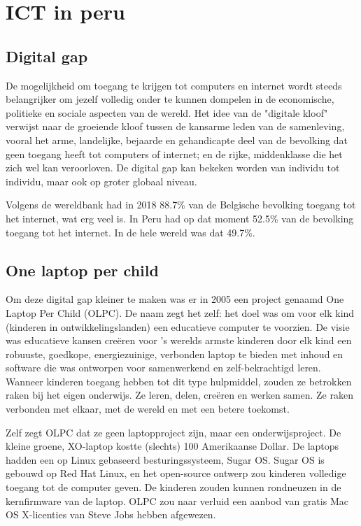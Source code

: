 \section{ICT in peru}
\subsection{Digital gap}
De mogelijkheid om toegang te krijgen tot computers en internet wordt steeds belangrijker om jezelf volledig onder te kunnen dompelen in de economische, politieke en sociale aspecten van de wereld. Het idee van de "digitale kloof" verwijst naar de groeiende kloof tussen de kansarme leden van de samenleving, vooral het arme, landelijke, bejaarde en gehandicapte deel van de bevolking dat geen toegang heeft tot computers of internet; en de rijke, middenklasse die het zich wel kan veroorloven. De digital gap kan bekeken worden van individu tot individu, maar ook op groter globaal niveau. \autocite{Marichick2000}

Volgens de wereldbank had in 2018 88.7\% van de Belgische bevolking toegang tot het internet, wat erg veel is. In Peru had op dat moment 52.5\% van de bevolking toegang tot het internet. In de hele wereld was dat 49.7\%. \autocite{WereldBank2018}

\subsection{One laptop per child}
Om deze digital gap kleiner te maken was er in 2005 een project genaamd One Laptop Per Child (OLPC). De naam zegt het zelf: het doel was om voor elk kind (kinderen in ontwikkelingslanden) een educatieve computer te voorzien. De visie was educatieve kansen creëren voor 's werelds armste kinderen door elk kind een robuuste, goedkope, energiezuinige, verbonden laptop te bieden met inhoud en software die was ontworpen voor samenwerkend en zelf-bekrachtigd leren. Wanneer kinderen toegang hebben tot dit type hulpmiddel, zouden ze betrokken raken bij het eigen onderwijs. Ze leren, delen, creëren en werken samen. Ze raken verbonden met elkaar, met de wereld en met een betere toekomst. \autocite{OneLaptopPerChild2005}

Zelf zegt OLPC dat ze geen laptopproject zijn, maar een onderwijsproject. De kleine groene, XO-laptop kostte (slechts) 100 Amerikaanse Dollar. De laptops hadden een op Linux gebaseerd besturingssysteem, Sugar OS. Sugar OS is gebouwd op Red Hat Linux, en het open-source ontwerp zou kinderen volledige toegang tot de computer geven. De kinderen zouden kunnen rondneuzen in de kernfirmware van de laptop. OLPC zou naar verluid een aanbod van gratis Mac OS X-licenties van Steve Jobs hebben afgewezen. \autocite{Robertson2018}

